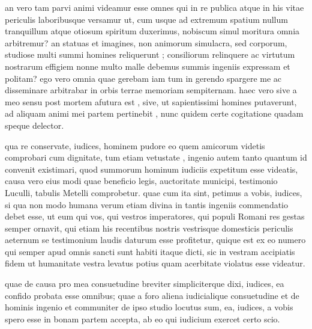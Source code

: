  an vero tam parvi animi videamur esse omnes qui in re publica atque in his vitae periculis laboribusque versamur ut, cum usque ad extremum spatium nullum tranquillum atque otiosum spiritum duxerimus, nobiscum simul moritura omnia arbitremur? an statuas et imagines, non animorum simulacra, sed corporum, studiose multi summi homines reliquerunt ; consiliorum relinquere ac virtutum nostrarum effigiem nonne multo malle debemus summis ingeniis expressam et politam? ego vero omnia quae gerebam iam tum in gerendo spargere me ac disseminare arbitrabar in orbis terrae memoriam sempiternam. haec vero sive a meo sensu post mortem afutura est , sive, ut sapientissimi homines putaverunt, ad aliquam animi mei partem pertinebit , nunc quidem certe cogitatione quadam speque delector.

 qua re conservate, iudices, hominem pudore eo quem amicorum videtis comprobari cum dignitate, tum etiam vetustate , ingenio autem tanto quantum id convenit existimari, quod summorum hominum iudiciis expetitum esse videatis, causa vero eius modi quae beneficio legis, auctoritate municipi, testimonio Luculli, tabulis Metelli comprobetur. quae cum ita sint, petimus a vobis, iudices, si qua non modo humana verum etiam divina in tantis ingeniis commendatio debet esse, ut eum qui vos, qui vestros imperatores, qui populi Romani res gestas semper ornavit, qui etiam his recentibus nostris vestrisque domesticis periculis aeternum se testimonium laudis daturum esse profitetur, quique est ex eo numero qui semper apud omnis sancti sunt habiti itaque dicti, sic in vestram accipiatis fidem ut humanitate vestra levatus potius quam acerbitate violatus esse videatur.

 quae de causa pro mea consuetudine breviter simpliciterque dixi, iudices, ea confido probata esse omnibus; quae a foro aliena iudicialique consuetudine et de hominis ingenio et communiter de ipso studio locutus sum, ea, iudices, a vobis spero esse in bonam partem accepta, ab eo qui iudicium exercet certo scio.
